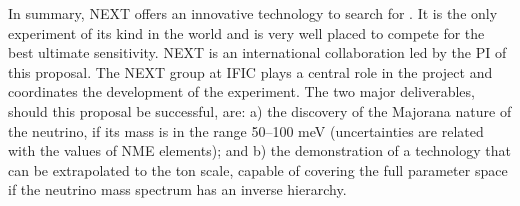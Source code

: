 
In summary,  NEXT offers an innovative technology to search for \bbonu. It is the only experiment of its kind in the world and  is very well placed to compete for the best ultimate sensitivity. NEXT is an international collaboration led by the PI of this proposal. The NEXT group at IFIC plays a central role in the project and coordinates the development of the experiment. The two major deliverables, should this proposal be successful, are: a) the discovery of the Majorana nature of the neutrino, if its mass is in the range 50--100 meV (uncertainties are related with the values of NME elements); and b) the demonstration of a technology that can be extrapolated to the ton scale, capable of covering the full parameter space if the neutrino mass spectrum has an inverse hierarchy.


